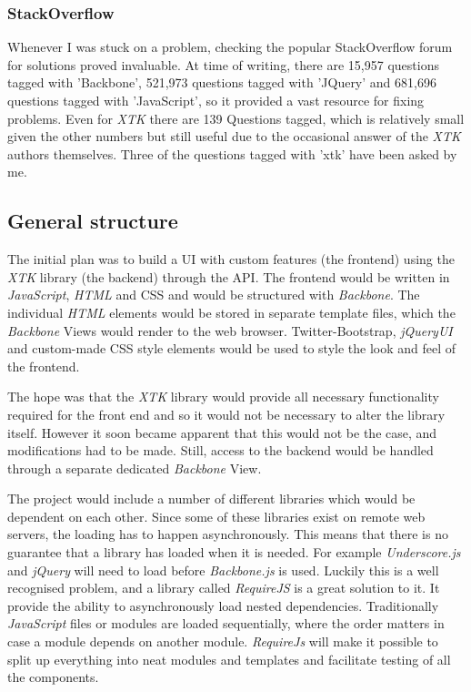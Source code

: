 \documentclass[a4paper,11pt,twoside]{article}
\begin{document}
\subsubsection{StackOverflow}

Whenever I was stuck on a problem, checking the popular StackOverflow forum for solutions proved invaluable. At time of writing, there are 15,957 questions tagged with 'Backbone', 521,973 questions tagged with 'JQuery' and 681,696 questions tagged with 'JavaScript', so it provided a vast resource for fixing problems. Even for \textit{XTK} there are 139 Questions tagged, which is relatively small given the other numbers but still useful due to the occasional answer of the \textit{XTK} authors themselves. Three of the questions tagged with 'xtk' have been asked by me.



\subsection{General structure}

The initial plan was to build a UI with custom features (the frontend) using the \textit{XTK} library (the backend) through the API. The frontend would be written in \textit{JavaScript}, \textit{HTML} and CSS and would be structured with \textit{Backbone}. The individual \textit{HTML} elements would be stored in separate template files, which the \textit{Backbone} Views would render to the web browser. Twitter-Bootstrap, \textit{jQueryUI} and custom-made CSS style elements would be used to style the look and feel of the frontend.

The hope was that the \textit{XTK} library would provide all necessary functionality required for the front end and so it would not be necessary to alter the library itself. However it soon became apparent that this would not be the case, and modifications had to be made. Still, access to the backend would be handled through a separate dedicated \textit{Backbone} View. 

The project would include a number of different libraries which would be dependent on each other. Since some of these libraries exist on remote web servers, the loading has to happen asynchronously. This means that there is no guarantee that a library has loaded when it is needed. For example \textit{Underscore.js} and \textit{jQuery} will need to load before \textit{Backbone.js} is used. Luckily this is a well recognised problem, and a library called \textit{RequireJS} is a great solution to it. It provide the ability to asynchronously load nested dependencies. Traditionally \textit{JavaScript} files or modules are loaded sequentially, where the order matters in case a module depends on another module. \textit{RequireJs} will make it possible to split up everything into neat modules and templates and facilitate testing of all the components.
\end{document}
